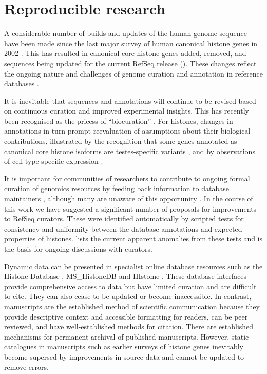 \section{Reproducible research}

  A considerable number of builds and updates of the human genome sequence have been made
  since the last major survey of human canonical histone genes in 2002 \citep{Marzluff02}.
  This has resulted in
  \AddedSinceReference{} canonical core histone genes added,
  \RemovedSinceReference{} removed,
  and \SequencesUpdatedSinceReference{} sequences
  being updated for the current RefSeq release ().
  These changes reflect the ongoing nature and challenges of
  genome curation and annotation in reference databases \citep{BorkKoonin1998}.

  It is inevitable that sequences and annotations will continue to be revised
  based on continuous curation and improved experimental insights.
  This has recently been recognised as the pricess of ``biocuration'' \citep{biocuration2018}.
  For histones, changes in annotations in turn prompt
  reevaluation of assumptions about their biological contributions,
  illustrated by the recognition that some genes
  annotated as canonical core histone isoforms are testes-specific variants \citep{Talbert2012},
  and by observations of cell type-specific expression \citep{YangGenomeBiol2011,Molden2015}.

  It is important for communities of researchers to contribute
  to ongoing formal curation of genomics resources
  by feeding back information to database maintainers \citep{SteinNRG2001},
  although many are unaware of this opportunity \citep{HollidaySPR2015}.
  In the course of this work we have suggested a significant number of proposals
  for improvements to RefSeq curators.
  These were identified automatically by scripted tests for consistency and uniformity
  between the database annotations and expected properties of histones.
   lists the current apparent anomalies from these tests
  and is the basis for ongoing discussions with curators.

  Dynamic data can be presented in specialist online database resources
  such as the Histone Database \citep{HistoneDB2016},
  MS\_HistoneDB \citep{ElkennaniGovin2017} and HIstome \citep{HIstome2012}.
  These database interfaces provide comprehensive access to data
  but have limited curation and are difficult to cite.
  They can also cease to be updated or become inaccessible.
  In contrast, manuscripts are the established method of scientific communication
  because they provide descriptive context and accessible formatting for readers,
  can be peer reviewed, and have well-established methods for citation.
  There are established mechanisms for permanent archival of published manuscripts.
  However, static catalogues in manuscripts
  such as earlier surveys of histone genes \citep{AlbigHumangen1997,Marzluff02}
  inevitably become supersed by improvements in source data and cannot be updated to remove errors.

